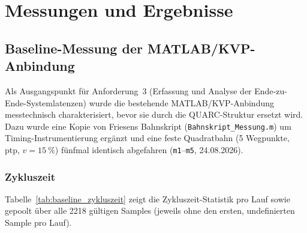 \section{Messungen und Ergebnisse}
\label{sec:results}


\subsection{Baseline-Messung der MATLAB/KVP-Anbindung}
\label{sec:baseline}

Als Ausgangspunkt für Anforderung~3 (Erfassung und Analyse der
Ende-zu-Ende-Systemlatenzen) wurde die bestehende MATLAB/KVP-Anbindung
messtechnisch charakterisiert, bevor sie durch die QUARC-Struktur ersetzt
wird. Dazu wurde eine Kopie von Friesens Bahnskript
(\texttt{Bahnskript\_Messung.m}) um Timing-Instrumentierung ergänzt und eine
feste Quadratbahn (5 Wegpunkte, \ac{ptp}, $v=\SI{15}{\percent}$) fünfmal
identisch abgefahren (\texttt{m1}--\texttt{m5}, 24.08.2026). %

\subsubsection{Zykluszeit}

Tabelle~\ref{tab:baseline_zykluszeit} zeigt die Zykluszeit-Statistik pro Lauf
sowie gepoolt über alle 2218 gültigen Samples (jeweils ohne den ersten,
undefinierten Sample pro Lauf).

